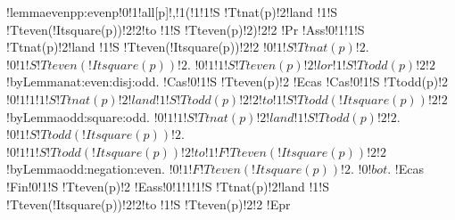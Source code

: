 !lemma{evenpp:evenp}{!0!1!all[p]!,!1(!1!1!S !Tt{nat}(p)!2!land !1!S !Tt{even}(!It{square}(p))!2!2!to !1!S !Tt{even}(p)!2)!2!2}
!Pr{
!Ass{!0!1!1!S !Tt{nat}(p)!2!land !1!S !Tt{even}(!It{square}(p))!2!2}
$!0!1!S !Tt{nat}(p)!2$.
$!0!1!S !Tt{even}(!It{square}(p))!2$.
$!0!1!1!S !Tt{even}(p)!2!lor !1!S !Tt{odd}(p)!2!2$!by{Lemma}{nat:even:disj:odd}.
!Cas{!0!1!S !Tt{even}(p)!2}
!Ecas
!Cas{!0!1!S !Tt{odd}(p)!2}
$!0!1!1!1!S !Tt{nat}(p)!2!land !1!S !Tt{odd}(p)!2!2!to !1!S !Tt{odd}(!It{square}(p))!2!2$!by{Lemma}{odd:square:odd}.
$!0!1!1!S !Tt{nat}(p)!2!land !1!S !Tt{odd}(p)!2!2$.
$!0!1!S !Tt{odd}(!It{square}(p))!2$.
$!0!1!1!S !Tt{odd}(!It{square}(p))!2!to !1!F !Tt{even}(!It{square}(p))!2!2$!by{Lemma}{odd:negation:even}.
$!0!1!F !Tt{even}(!It{square}(p))!2$.
$!0!bot$.
!Ecas
!Fin{!0!1!S !Tt{even}(p)!2}
!Eass{!0!1!1!1!S !Tt{nat}(p)!2!land !1!S !Tt{even}(!It{square}(p))!2!2!to !1!S !Tt{even}(p)!2!2}}
!Epr

